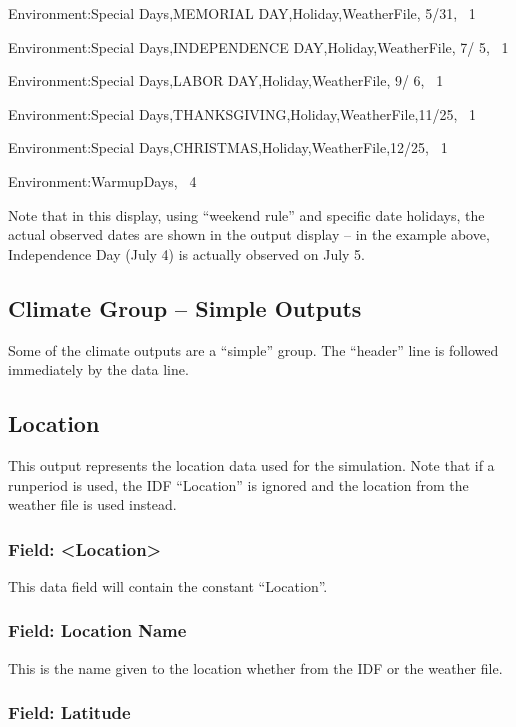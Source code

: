 Environment:Special Days,MEMORIAL DAY,Holiday,WeatherFile, 5/31,~ 1

Environment:Special Days,INDEPENDENCE DAY,Holiday,WeatherFile, 7/ 5,~ 1

Environment:Special Days,LABOR DAY,Holiday,WeatherFile, 9/ 6,~ 1

Environment:Special Days,THANKSGIVING,Holiday,WeatherFile,11/25,~ 1

Environment:Special Days,CHRISTMAS,Holiday,WeatherFile,12/25,~ 1

Environment:WarmupDays,~ 4

Note that in this display, using ``weekend rule'' and specific date holidays, the actual observed dates are shown in the output display -- in the example above, Independence Day (July 4) is actually observed on July 5.

\subsection{Climate Group -- Simple Outputs}\label{climate-group-simple-outputs}

Some of the climate outputs are a ``simple'' group. The ``header'' line is followed immediately by the data line.

\subsection{Location}\label{location}

This output represents the location data used for the simulation. Note that if a runperiod is used, the IDF ``Location'' is ignored and the location from the weather file is used instead.

\subsubsection{Field: \textless{}Location\textgreater{}}\label{field-location}

This data field will contain the constant ``Location''.

\subsubsection{Field: Location Name}\label{field-location-name}

This is the name given to the location whether from the IDF or the weather file.

\subsubsection{Field: Latitude}\label{field-latitude}

